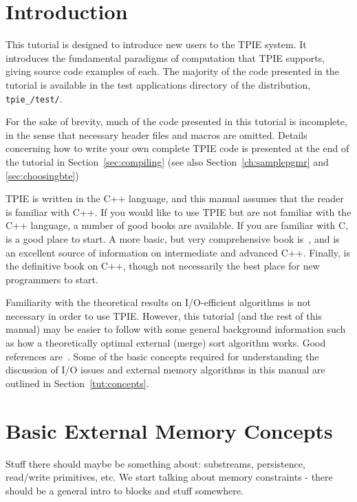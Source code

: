 \section{Introduction}

This tutorial is designed to introduce new users to the TPIE system.
It introduces the fundamental paradigms of computation that TPIE
supports, giving source code examples of each.  The majority of the
code presented in the tutorial is available in the test
applications directory of the distribution, 
{\tt tpie\_\version/test/}.

For the sake of brevity, much of the code presented in this tutorial is
incomplete, in the sense that necessary header files 
and macros are omitted. Details concerning how to write your
own complete TPIE code is presented at the end of the tutorial in
Section~\ref{sec:compiling} (see also Section~\ref{ch:samplepgmr} and
\ref{sec:choosingbte})

TPIE is written in the C++ language, and this manual assumes
that the reader is familiar with C++.  If you would like to
use TPIE but are not familiar with the C++
language, a number of good books are available. If you are
familiar with C, \cite{pohl:c++} is a good place to
start. A more basic, but very comprehensive book
is~\cite{deitel:c++}, and \cite{meyers:effective} is an
excellent source of information on intermediate and advanced
C++.  Finally, \cite{ellis:arm} is the definitive book on
C++, though not necessarily the best place for new
programmers to start.

Familiarity with the theoretical results on I/O-efficient
algorithms is not necessary in order to use TPIE. However,
this tutorial (and the rest of this manual) may be easier to
follow with some general background information such as how
a theoretically optimal external (merge) sort algorithm
works. Good references
are~\cite{vitter:podssurvey,arge:gisbook,aggarwal:input}.
Some of the basic concepts required for understanding the
discussion of I/O issues and external memory algorithms in
this manual are outlined in Section~\ref{tut:concepts}.

\section{Basic External Memory Concepts}
Stuff there should maybe be something about: substreams,
persistence, read/write primitives, etc. 
We start talking about memory
   constraints - there should be a general intro to blocks
   and stuff somewhere.


